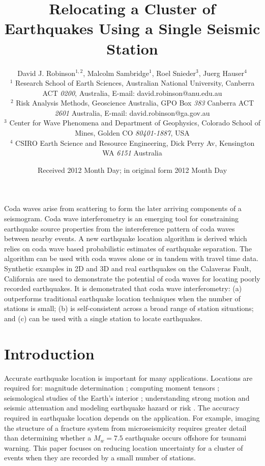 \documentclass[extra, onecolumn, doublespacing]{gji}
\title{Relocating a Cluster of Earthquakes Using a Single Seismic Station}
\author[D.J. Robinson, M. Sambridge, R. Snieder and J Hauser]
  {David J. Robinson$^{1,2}$, Malcolm Sambridge$^{1}$, Roel Snieder$^{3}$, Juerg Hauser$^{4}$ \\
  $^1$ Research School of Earth Sciences, Australian National
    University, Canberra ACT \emph{0200}, Australia, E-mail: david.robinson@anu.edu.au \\
$^2$  Risk Analysis Methods, Geoscience Australia, GPO Box \emph{383} Canberra ACT \emph{2601} Australia, E-mail: david.robinson@ga.gov.au\\
$^3$ Center for Wave Phenomena and Department of Geophysics, Colorado School of Mines, Golden CO \emph{80401-1887}, USA \\
$^4$ CSIRO Earth Science and Resource Engineering, Dick Perry Av, Kensington WA \emph{6151} Australia}
\date{Received 2012 Month Day; in original form 2012 Month Day}
\begin{document}
\label{firstpage}

\maketitle


\begin{summary}
Coda waves arise from scattering to form the later arriving
components of a seismogram. Coda wave interferometry is an emerging
tool for constraining earthquake source properties from the
intereference pattern of coda waves between nearby events. A new
earthquake location algorithm is derived which relies on coda wave
based probabilistic estimates of earthquake separation. The
algorithm can be used with coda waves alone or in tandem with travel
time data. Synthetic examples in 2D and 3D and real earthquakes on
the Calaveras Fault, California are used to demonstrate the
potential of coda waves for locating poorly recorded earthquakes. It
is demonstrated that coda wave interferometry: (a) outperforms
traditional earthquake location techniques when the number of
stations is small; (b) is self-consistent across a broad range of
station situations; and (c) can be used with a single station to
locate earthquakes.

\end{summary}


\section{Introduction}

Accurate earthquake location is important for many applications. Locations
are required for:  magnitude
determination \citep{dr_Richter35a, dr_Gutenberg45a};
computing moment tensors \citep{dr_Sipkin02a};
seismological studies of the Earth's interior
\citep{dr_Spencer80a, dr_Kennett95a, dr_Curtis02a, dr_Kennett04a};
understanding strong motion and seismic attenuation
\citep{dr_Toro97a, dr_Campbell03a}
 and modeling earthquake hazard or risk
\citep{dr_Frankel00a, dr_Stirling02a, dr_Robinson06b}.
The accuracy required in earthquake location depends on the
application. For example, imaging the structure of a fracture system
from microseismicity requires greater detail than determining
whether a $M_w=7.5$ earthquake occurs offshore for tsunami warning.
 This paper focuses on reducing location uncertainty for
a cluster of events when they are recorded by a small
number of stations.
\end{document}
